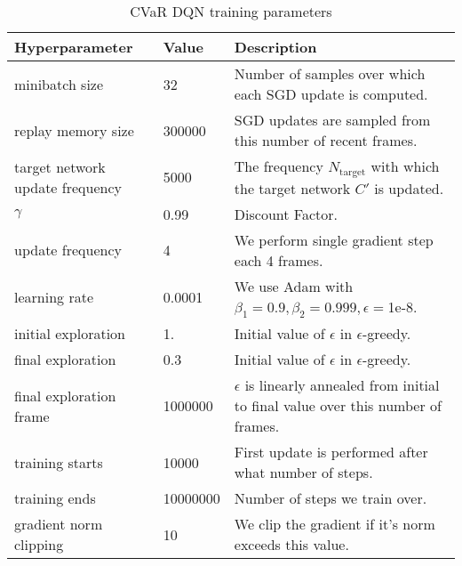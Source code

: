 \begin{table}[h]
\centering
\caption{CVaR DQN training parameters}
\label{dqnparams}
\begin{tabular}{l|l|p{7cm}}
\textbf{Hyperparameter}         & \textbf{Value} & \textbf{Description}                                                                    \\\hline
minibatch size                  & 32             & Number of samples over which each SGD update is computed.                               \\
replay memory size              & 300000         & SGD updates are sampled from this number of recent frames.                              \\
target network update frequency & 5000           & The frequency $N_{\text{target}}$ with which the target network $C'$ is updated.        \\
$\gamma$                        & 0.99           & Discount Factor.                                                                        \\
update frequency                & 4              & We perform single gradient step each 4 frames.                                          \\
learning rate                   & 0.0001         & We use Adam with $\beta_1=0.9, \beta_2=0.999, \epsilon=$1e-8.                           \\
initial exploration             & 1.             & Initial value of $\epsilon$ in $\epsilon$-greedy.                                       \\
final exploration               & 0.3            & Initial value of $\epsilon$ in $\epsilon$-greedy.                                       \\
final exploration frame         & 1000000        & $\epsilon$ is linearly annealed from initial to final value over this number of frames. \\
training starts                 & 10000          & First update is performed after what number of steps.                                   \\
training ends                   & 10000000       & Number of steps we train over.                                                          \\
gradient norm clipping          & 10             & We clip the gradient if it's norm exceeds this value.                                  
\end{tabular}
\end{table}